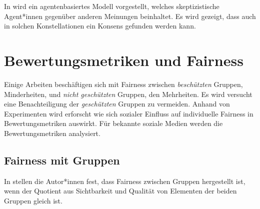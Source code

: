 In \cite{Tsang2014277} wird ein agentenbasiertes Modell vorgestellt, welches skeptizistische Agent*innen gegenüber anderen Meinungen beinhaltet. Es wird gezeigt, dass auch in solchen Konstellationen ein Konsens gefunden werden kann.

\section{Bewertungsmetriken und Fairness}

Einige Arbeiten beschäftigen sich mit Fairness zwischen \textit{beschützten} Gruppen, Minderheiten, und \textit{nicht geschützten} Gruppen, den Mehrheiten. Es wird versucht eine Benachteiligung der \textit{geschützten} Gruppen zu vermeiden. Anhand von Experimenten wird erforscht wie sich sozialer Einfluss auf individuelle Fairness in Bewertungsmetriken auswirkt. Für bekannte soziale Medien werden die Bewertungsmetriken analysiert.





\subsection{Fairness mit Gruppen}

In \cite{castillo} stellen die Autor*innen fest, dass Fairness zwischen Gruppen hergestellt ist, wenn der Quotient aus Sichtbarkeit und Qualität von Elementen der beiden Gruppen gleich ist.

